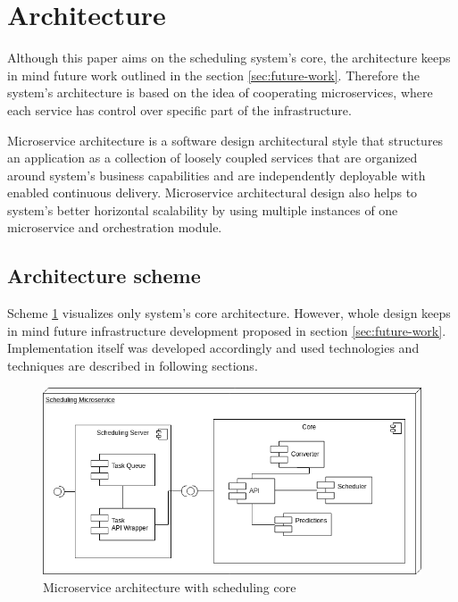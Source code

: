 \section{Architecture}\label{sec:architecture}

Although this paper aims on the scheduling system's core,
the architecture keeps in mind future work outlined in the section \ref{sec:future-work}.
Therefore the system's architecture  is based on the idea of cooperating microservices,
where each service has control over specific part of the infrastructure. 

Microservice architecture is a software design architectural style 
that structures an application as a collection of loosely coupled services that 
are organized around system's business capabilities\cite{namiot2014micro} 
and are independently deployable with enabled continuous delivery\cite{balalaie2016microservices}.
Microservice architectural design also helps to system's better horizontal scalability
by using multiple instances of one microservice 
and orchestration module.


\subsection{Architecture scheme}\label{subsec:architecture-scheme}
Scheme \ref{fig:scheduling-core-arch} visualizes only system's core architecture. 
However,
whole design keeps in mind future infrastructure development proposed in section \ref{sec:future-work}.
Implementation itself was developed accordingly 
and used technologies and techniques are described in following sections.

\begin{figure}[ht]
    \includegraphics[width=\textwidth]{i_scheduler.png} 
    \centering
    \caption{Microservice architecture with scheduling core}
    \label{fig:scheduling-core-arch}
\end{figure}

